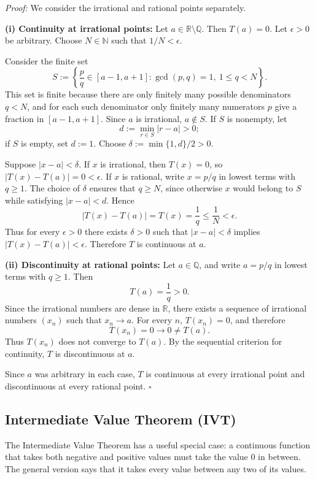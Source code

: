 \documentclass[a4paper,11pt,abstracton]{scrartcl}
\newcommand{\RR}{\mathbb{R}}
\newcommand{\NN}{\mathbb{N}}
\newcommand{\QQ}{\mathbb{Q}}
\theoremstyle{dotlessP}
\theoremstyle{dotlessS}
\theoremstyle{remark}
\theoremstyle{definition}
\begin{document}
\begin{claim_box}
\textit{Proof:}
We consider the irrational and rational points separately.

\textbf{(i) Continuity at irrational points:}
Let $a\in\RR\setminus\QQ$. Then $T(a)=0$. Let $\epsilon>0$ be arbitrary. Choose $N\in\NN$ such that $1/N<\epsilon$.

Consider the finite set
\[
    S:=\left\{\frac pq\in[a-1,a+1]:\gcd(p,q)=1,\ 1\le q<N\right\}.
\]
This set is finite because there are only finitely many possible denominators $q<N$, and for each such denominator only finitely many numerators $p$ give a fraction in $[a-1,a+1]$. Since $a$ is irrational, $a\notin S$. If $S$ is nonempty, let
\[
    d:=\min_{r\in S}|r-a|>0;
\]
if $S$ is empty, set $d:=1$. Choose $\delta:=\min\{1,d\}/2>0$.

Suppose $|x-a|<\delta$. If $x$ is irrational, then $T(x)=0$, so $|T(x)-T(a)|=0<\epsilon$. If $x$ is rational, write $x=p/q$ in lowest terms with $q\ge1$. The choice of $\delta$ ensures that $q\ge N$, since otherwise $x$ would belong to $S$ while satisfying $|x-a|<d$. Hence
\[
    |T(x)-T(a)|=T(x)=\frac1q\le\frac1N<\epsilon.
\]
Thus for every $\epsilon>0$ there exists $\delta>0$ such that $|x-a|<\delta$ implies $|T(x)-T(a)|<\epsilon$. Therefore $T$ is continuous at $a$.

\medskip
\textbf{(ii) Discontinuity at rational points:}
Let $a\in\QQ$, and write $a=p/q$ in lowest terms with $q\ge1$. Then
\[
    T(a)=\frac1q>0.
\]
Since the irrational numbers are dense in $\RR$, there exists a sequence of irrational numbers $(x_n)$ such that $x_n\to a$. For every $n$, $T(x_n)=0$, and therefore
\[
    T(x_n)=0\longrightarrow 0\ne T(a).
\]
Thus $T(x_n)$ does not converge to $T(a)$. By the sequential criterion for continuity, $T$ is discontinuous at $a$.

Since $a$ was arbitrary in each case, $T$ is continuous at every irrational point and discontinuous at every rational point.
\hfill$\square$
\end{claim_box}

\subsection{Intermediate Value Theorem (IVT)}

The Intermediate Value Theorem has a useful special case: a continuous function that takes both negative and positive values must take the value $0$ in between. The general version says that it takes every value between any two of its values.
\end{document}
